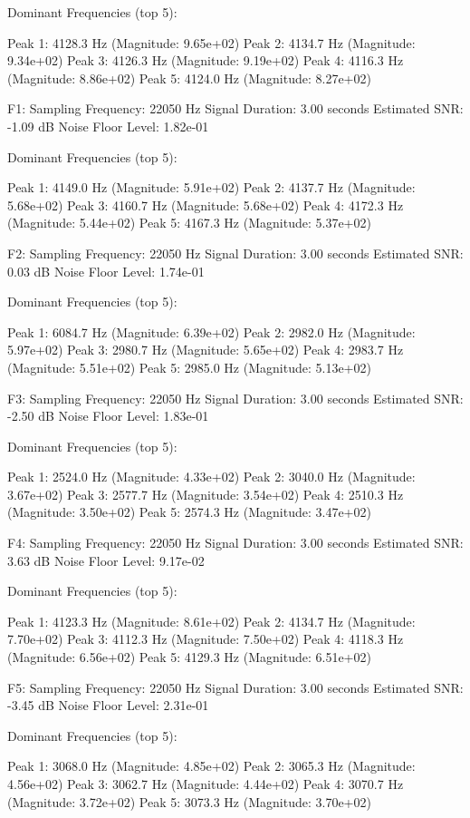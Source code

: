 \documentclass[a4paper,12pt]{article}
\begin{document}
Dominant Frequencies (top 5):

Peak 1: 4128.3 Hz (Magnitude: 9.65e+02)
Peak 2: 4134.7 Hz (Magnitude: 9.34e+02)
Peak 3: 4126.3 Hz (Magnitude: 9.19e+02)
Peak 4: 4116.3 Hz (Magnitude: 8.86e+02)
Peak 5: 4124.0 Hz (Magnitude: 8.27e+02)


F1: 
Sampling Frequency: 22050 Hz
Signal Duration: 3.00 seconds
Estimated SNR: -1.09 dB
Noise Floor Level: 1.82e-01

Dominant Frequencies (top 5):

Peak 1: 4149.0 Hz (Magnitude: 5.91e+02)
Peak 2: 4137.7 Hz (Magnitude: 5.68e+02)
Peak 3: 4160.7 Hz (Magnitude: 5.68e+02)
Peak 4: 4172.3 Hz (Magnitude: 5.44e+02)
Peak 5: 4167.3 Hz (Magnitude: 5.37e+02)

F2:
Sampling Frequency: 22050 Hz
Signal Duration: 3.00 seconds
Estimated SNR: 0.03 dB
Noise Floor Level: 1.74e-01

Dominant Frequencies (top 5):

Peak 1: 6084.7 Hz (Magnitude: 6.39e+02)
Peak 2: 2982.0 Hz (Magnitude: 5.97e+02)
Peak 3: 2980.7 Hz (Magnitude: 5.65e+02)
Peak 4: 2983.7 Hz (Magnitude: 5.51e+02)
Peak 5: 2985.0 Hz (Magnitude: 5.13e+02)

F3:
Sampling Frequency: 22050 Hz
Signal Duration: 3.00 seconds
Estimated SNR: -2.50 dB
Noise Floor Level: 1.83e-01

Dominant Frequencies (top 5):

Peak 1: 2524.0 Hz (Magnitude: 4.33e+02)
Peak 2: 3040.0 Hz (Magnitude: 3.67e+02)
Peak 3: 2577.7 Hz (Magnitude: 3.54e+02)
Peak 4: 2510.3 Hz (Magnitude: 3.50e+02)
Peak 5: 2574.3 Hz (Magnitude: 3.47e+02)

F4:
Sampling Frequency: 22050 Hz
Signal Duration: 3.00 seconds
Estimated SNR: 3.63 dB
Noise Floor Level: 9.17e-02

Dominant Frequencies (top 5):

Peak 1: 4123.3 Hz (Magnitude: 8.61e+02)
Peak 2: 4134.7 Hz (Magnitude: 7.70e+02)
Peak 3: 4112.3 Hz (Magnitude: 7.50e+02)
Peak 4: 4118.3 Hz (Magnitude: 6.56e+02)
Peak 5: 4129.3 Hz (Magnitude: 6.51e+02)

F5:
Sampling Frequency: 22050 Hz
Signal Duration: 3.00 seconds
Estimated SNR: -3.45 dB
Noise Floor Level: 2.31e-01

Dominant Frequencies (top 5):

Peak 1: 3068.0 Hz (Magnitude: 4.85e+02)
Peak 2: 3065.3 Hz (Magnitude: 4.56e+02)
Peak 3: 3062.7 Hz (Magnitude: 4.44e+02)
Peak 4: 3070.7 Hz (Magnitude: 3.72e+02)
Peak 5: 3073.3 Hz (Magnitude: 3.70e+02)
\end{document}
